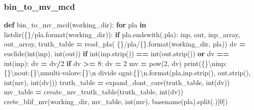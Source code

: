 \documentclass[
  italian,
]{book}
\newenvironment{Shaded}{\begin{snugshade}}{\end{snugshade}}
\newcommand{\BuiltInTok}[1]{#1}
\newcommand{\CharTok}[1]{\textcolor[rgb]{0.31,0.60,0.02}{#1}}
\newcommand{\ControlFlowTok}[1]{\textcolor[rgb]{0.13,0.29,0.53}{\textbf{#1}}}
\newcommand{\DecValTok}[1]{\textcolor[rgb]{0.00,0.00,0.81}{#1}}
\newcommand{\KeywordTok}[1]{\textcolor[rgb]{0.13,0.29,0.53}{\textbf{#1}}}
\newcommand{\NormalTok}[1]{#1}
\newcommand{\OperatorTok}[1]{\textcolor[rgb]{0.81,0.36,0.00}{\textbf{#1}}}
\newcommand{\SpecialCharTok}[1]{\textcolor[rgb]{0.00,0.00,0.00}{#1}}
\newcommand{\StringTok}[1]{\textcolor[rgb]{0.31,0.60,0.02}{#1}}
\begin{document}
\newpage

\hypertarget{bin_to_mv_mcd}{%
\subsubsection{bin\_to\_mv\_mcd}\label{bin_to_mv_mcd}}

\begin{Shaded}
\begin{Highlighting}[]
\KeywordTok{def}\NormalTok{ bin\_to\_mv\_mcd(working\_dir):}
  \ControlFlowTok{for}\NormalTok{ pla }\KeywordTok{in}\NormalTok{ listdir(}\StringTok{\textquotesingle{}}\SpecialCharTok{\{\}}\StringTok{/pla\textquotesingle{}}\NormalTok{.}\BuiltInTok{format}\NormalTok{(working\_dir)):}
    \ControlFlowTok{if}\NormalTok{ pla.endswith(}\StringTok{\textquotesingle{}.pla\textquotesingle{}}\NormalTok{):}
\NormalTok{      inp, out, inp\_array, out\_array, truth\_table }\OperatorTok{=}\NormalTok{ read\_pla(}
        \StringTok{\textquotesingle{}}\SpecialCharTok{\{\}}\StringTok{/pla/}\SpecialCharTok{\{\}}\StringTok{\textquotesingle{}}\NormalTok{.}\BuiltInTok{format}\NormalTok{(working\_dir, pla))}
\NormalTok{      dv }\OperatorTok{=}\NormalTok{ euclide(}\BuiltInTok{int}\NormalTok{(inp), }\BuiltInTok{int}\NormalTok{(out))}
      \ControlFlowTok{if} \BuiltInTok{int}\NormalTok{(inp.strip()) }\OperatorTok{==} \BuiltInTok{int}\NormalTok{(out.strip()) }\KeywordTok{or}\NormalTok{ dv }\OperatorTok{==} \BuiltInTok{int}\NormalTok{(inp):}
\NormalTok{        dv }\OperatorTok{=}\NormalTok{ dv}\OperatorTok{/}\DecValTok{2}
      \ControlFlowTok{if}\NormalTok{ dv }\OperatorTok{\textgreater{}=} \DecValTok{8}\NormalTok{:}
\NormalTok{        dv }\OperatorTok{=} \DecValTok{2} 
\NormalTok{        mv }\OperatorTok{=} \BuiltInTok{pow}\NormalTok{(}\DecValTok{2}\NormalTok{, dv)}
        \BuiltInTok{print}\NormalTok{(}\StringTok{\textquotesingle{}}\SpecialCharTok{\{\}}\CharTok{\textbackslash{}n}\StringTok{inp: }\SpecialCharTok{\{\}}\CharTok{\textbackslash{}n}\StringTok{out:}\SpecialCharTok{\{\}}\CharTok{\textbackslash{}n}\StringTok{multi{-}valore:}\SpecialCharTok{\{\}}\CharTok{\textbackslash{}n}
\StringTok{          divide ogni:}\SpecialCharTok{\{\}}\CharTok{\textbackslash{}n}\StringTok{\textquotesingle{}}\NormalTok{.}\BuiltInTok{format}\NormalTok{(pla,inp.strip(), }
\NormalTok{          out.strip(), }\BuiltInTok{int}\NormalTok{(mv), }\BuiltInTok{int}\NormalTok{(dv)))}
\NormalTok{        truth\_table }\OperatorTok{=}\NormalTok{ expand\_dont\_care(truth\_table, }\BuiltInTok{int}\NormalTok{(dv))}
\NormalTok{        mv\_table }\OperatorTok{=}\NormalTok{ create\_mv\_truth\_table(truth\_table, }\BuiltInTok{int}\NormalTok{(dv))}
\NormalTok{        crete\_blif\_mv(working\_dir, mv\_table, }\BuiltInTok{int}\NormalTok{(mv),}
\NormalTok{          basename(pla).split(}\StringTok{\textquotesingle{}.\textquotesingle{}}\NormalTok{)[}\DecValTok{0}\NormalTok{])}
\end{Highlighting}
\end{Shaded}
\end{document}
